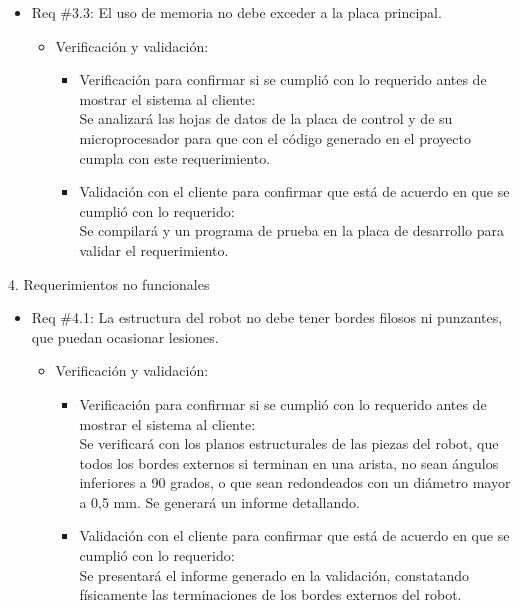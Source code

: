 \documentclass[
11pt, %
codirector, %
]{charter}
\begin{document}
\begin{itemize}
\item Req \#3.3: El uso de memoria no debe exceder a la placa principal.
\begin{itemize}
\item Verificación y validación:
	\begin{itemize}
	\item Verificación para confirmar si se cumplió con lo requerido 	antes de mostrar el sistema al cliente:\\
	Se analizará las hojas de datos de la placa de control y de su
	microprocesador para que con el código generado en el proyecto cumpla con este requerimiento.
	\item Validación con el cliente para confirmar que está de 				acuerdo en que se cumplió con lo requerido:\\
	Se compilará y  un programa de prueba en la placa de
 	desarrollo para validar el requerimiento.
	\end{itemize}
\end{itemize}
\end{itemize}

\vspace{0.5cm}

4. Requerimientos no funcionales

\begin{itemize}
\item Req \#4.1: La estructura del robot no debe tener bordes filosos ni punzantes, que puedan ocasionar lesiones. 
\begin{itemize}
\item Verificación y validación:
	\begin{itemize}
	\item Verificación para confirmar si se cumplió con lo requerido 	antes de mostrar el sistema al cliente:\\
	Se verificará con los planos estructurales de las piezas del
	robot, que todos los bordes externos si terminan en una arista,
	no sean ángulos inferiores a 90 grados, o que sean redondeados
	con un diámetro mayor a 0,5 mm. Se generará un informe
	detallando.
	\item Validación con el cliente para confirmar que está de 				acuerdo en que se cumplió con lo requerido:\\
	Se presentará el informe generado en la validación, constatando  
	físicamente las terminaciones de los bordes externos del robot.
	\end{itemize}
\end{itemize}
\end{itemize}
\end{document}
